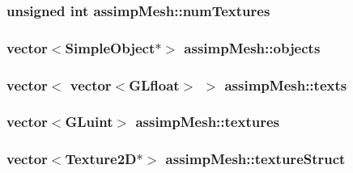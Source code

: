 \hypertarget{classassimp_mesh_a5bca3d425fef3b8cef719bb9e0384d8a}{
\subsubsection[{num\-Textures}]{\setlength{\rightskip}{0pt plus 5cm}unsigned {\bf int} assimp\-Mesh\-::num\-Textures}}\label{classassimp_mesh_a5bca3d425fef3b8cef719bb9e0384d8a}
\hypertarget{classassimp_mesh_a130a8db8b84bdb7b83599034a5543763}{
\subsubsection[{objects}]{\setlength{\rightskip}{0pt plus 5cm}vector$<${\bf Simple\-Object}$\ast$$>$ assimp\-Mesh\-::objects}}\label{classassimp_mesh_a130a8db8b84bdb7b83599034a5543763}
\hypertarget{classassimp_mesh_af73735a4a7b8b692b658af1e4f292e6d}{
\subsubsection[{texts}]{\setlength{\rightskip}{0pt plus 5cm}vector$<$ vector$<${\bf G\-Lfloat}$>$ $>$ assimp\-Mesh\-::texts}}\label{classassimp_mesh_af73735a4a7b8b692b658af1e4f292e6d}
\hypertarget{classassimp_mesh_a5b64a6b1ffa93791b51bc0205d7f8dfa}{
\subsubsection[{textures}]{\setlength{\rightskip}{0pt plus 5cm}vector$<${\bf G\-Luint}$>$ assimp\-Mesh\-::textures}}\label{classassimp_mesh_a5b64a6b1ffa93791b51bc0205d7f8dfa}
\hypertarget{classassimp_mesh_ad7c6c414b638d448d4f4ee5ce1e47fae}{
\subsubsection[{texture\-Struct}]{\setlength{\rightskip}{0pt plus 5cm}vector$<${\bf Texture2\-D}$\ast$$>$ assimp\-Mesh\-::texture\-Struct}}\label{classassimp_mesh_ad7c6c414b638d448d4f4ee5ce1e47fae}
